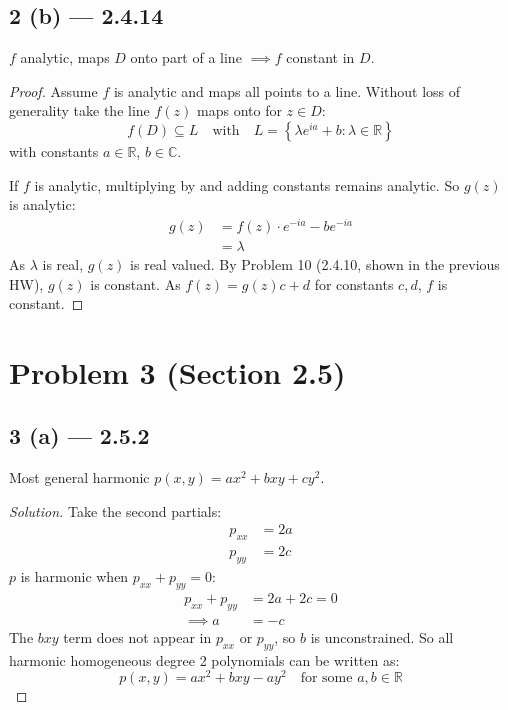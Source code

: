 \documentclass{article}
\newenvironment{solution}{
\begin{proof}[Solution]}{
\end{proof}}
\begin{document}
\subsection*{2 (b) --- 2.4.14}
$f$ analytic, maps $D$ onto part of a line $\implies f$ constant in $D$.
\begin{proof}
  Assume $f$ is analytic and maps all points to a line. Without loss of
  generality take the line $f(z)$ maps onto for $z \in D$:
  \[
    f(D) \subseteq L
    \quad \text{with} \quad
    L = \left\{\lambda e^{ia} + b : \lambda \in \mathbb{R}\right\}
  \]
  with constants $a \in \mathbb{R}$, $b \in \mathbb{C}$.

  If $f$ is analytic, multiplying by and adding constants remains analytic. So
  $g(z)$ is analytic:
  \begin{align*}
    g(z)
    &= f(z) \cdot e^{-ia} - be^{-ia}
    \\ &= \lambda
  \end{align*}
  As $\lambda$ is real, $g(z)$ is real valued. By Problem 10 (2.4.10, shown in
  the previous HW), $g(z)$ is constant. As $f(z) = g(z)c + d$ for constants
  $c, d$, $f$ is constant.
\end{proof}

\section*{Problem 3 (Section 2.5)}

\subsection*{3 (a) --- 2.5.2}
Most general harmonic $p(x, y) = ax^2 + bxy + cy^2$.
\begin{solution}
  Take the second partials:
  \begin{align*}
    p_{xx} &= 2a
    \\ p_{yy} &= 2c
  \end{align*}
  $p$ is harmonic when $p_{xx} + p_{yy} = 0$:
  \begin{align*}
    p_{xx} + p_{yy} &= 2a + 2c = 0
    \\ \implies a &= -c
  \end{align*}
  The $bxy$ term does not appear in $p_{xx}$ or $p_{yy}$, so $b$ is
  unconstrained. So all harmonic homogeneous degree 2 polynomials can be
  written as:
  \[
    p(x, y) = ax^2 + bxy - ay^2 \quad \text{for some } a, b \in \mathbb{R}
  \]
\end{solution}
\end{document}
